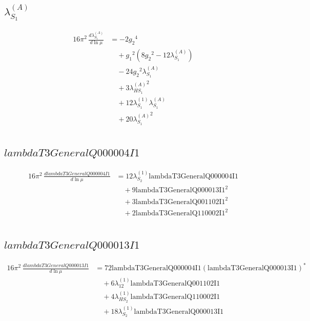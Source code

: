\documentclass[10pt,a4paper]{article}
\begin{document}
\subsection*{$\lambda_{S_1}^{(A)}$}
\begin{align*}
16\pi^2\,\frac{d \lambda_{S_1}^{(A)}}{d\ln\mu} &=-2 {g_2}^4 \\
&\quad +{g_1}^2 \left(8 {g_2}^2-12 {\lambda_{S_1}^{(A)}}\right) \\
&\quad -24 {g_2}^2 {\lambda_{S_1}^{(A)}} \\
&\quad +3 {\lambda_{HS_1}^{(A)}}^2 \\
&\quad +12 {\lambda_{S_1}^{(1)}} {\lambda_{S_1}^{(A)}} \\
&\quad +20 {\lambda_{S_1}^{(A)}}^2 \\
\end{align*}
\subsection*{$lambdaT3GeneralQ000004I1$}
\begin{align*}
16\pi^2\,\frac{d lambdaT3GeneralQ000004I1}{d\ln\mu} &=12 {\lambda_{S_2}^{(1)}} \text{lambdaT3GeneralQ000004I1} \\
&\quad +9 \text{lambdaT3GeneralQ000013I1}^2 \\
&\quad +3 \text{lambdaT3GeneralQ001102I1}^2 \\
&\quad +2 \text{lambdaT3GeneralQ110002I1}^2 \\
\end{align*}
\subsection*{$lambdaT3GeneralQ000013I1$}
\begin{align*}
16\pi^2\,\frac{d lambdaT3GeneralQ000013I1}{d\ln\mu} &=72 \text{lambdaT3GeneralQ000004I1} \left(\text{lambdaT3GeneralQ000013I1}\right)^{*} \\
&\quad +6 {\lambda_{12}^{(1)}} \text{lambdaT3GeneralQ001102I1} \\
&\quad +4 {\lambda_{HS_2}^{(1)}} \text{lambdaT3GeneralQ110002I1} \\
&\quad +18 {\lambda_{S_2}^{(1)}} \text{lambdaT3GeneralQ000013I1} \\
\end{align*}
\end{document}
